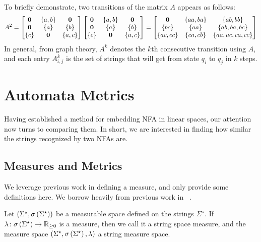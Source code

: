 \documentclass[12pt]{article}
\begin{document}
\begin{example}
  To briefly demonstrate, two transitions of the matrix \(A\) appears as
  follows:
  \begin{align*}
    A^2 =
      \begin{bmatrix}
        \mathbf{0} & \left\{a, b\right\} & \mathbf{0} \\
        \mathbf{0} & \left\{a\right\} & \left\{b\right\} \\
        \left\{c\right\} & \mathbf{0} & \left\{a, c\right\}
      \end{bmatrix} 
      \begin{bmatrix}
        \mathbf{0} & \left\{a, b\right\} & \mathbf{0} \\
        \mathbf{0} & \left\{a\right\} & \left\{b\right\} \\
        \left\{c\right\} & \mathbf{0} & \left\{a, c\right\}
      \end{bmatrix}
      =
      \begin{bmatrix}
        \mathbf{0} & \left\{aa, ba\right\} & \left\{ab, bb\right\} \\
        \left\{bc\right\} & \left\{aa\right\} & \left\{ab, ba, bc\right\} \\
        \left\{ac, cc\right\} & \left\{ca, cb\right\} & \left\{aa, ac, ca, cc\right\}
      \end{bmatrix}
  \end{align*}
  In general, from graph theory, \(A^k\) denotes the \(k\)th consecutive
  transition using \(A\),
  and each entry \(A^k _{i, j}\) is the set of strings that will
  get from state \(q_i\) to \(q_j\) in \(k\) steps.

\end{example}


\section{Automata Metrics}
Having established a method for embedding NFA in linear spaces,
our attention now turns to comparing them.
In short, we are interested in finding how similar the strings
recognized by two NFAs are.

\subsection{Measures and Metrics}
We leverage previous work in defining a measure,
and only provide some definitions here.
We borrow heavily from previous work in ~\cite{xue2018langmeasures}.

\begin{definition}
  Let
  \(\left(\Sigma^\star, \sigma\left(\Sigma^\star\right)\right)\)
  be a measurable space defined on the strings \(\Sigma^\star\).
  If \(\lambda \colon \sigma\left(\Sigma^\star\right) \to \mathbb{R}_{\geq 0}\) is a measure,
  then we call it a string space measure,
  and the measure space
  \(\left(\Sigma^\star, \sigma\left(\Sigma^\star\right), \lambda\right)\)
  a string measure space.
\end{definition}
\end{document}
